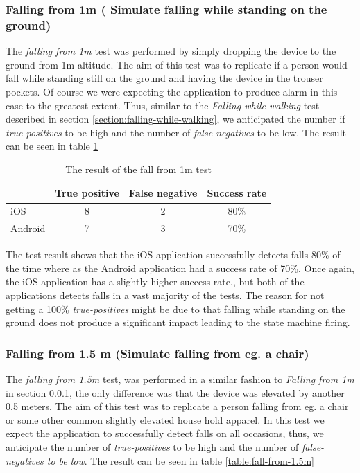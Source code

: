 \documentclass[12pt, a4paper, onecolumn]{article}
\begin{document}
	
	\subsubsection{Falling  from 1m ( Simulate falling while standing on the ground)}
	\label{section:falling-from-1m}
	The  \textit{falling from 1m} test was performed by simply dropping the device to the ground from 1m altitude. The aim of this test was to replicate if a person would fall while standing still on the ground and having the device in the trouser pockets. Of course we were expecting the application to produce alarm in this case to the greatest extent. Thus, similar to the \textit{Falling while walking} test described in section \ref{section:falling-while-walking}, we anticipated the number if \textit{true-positives} to be high and the number of \textit{false-negatives} to be low. The result can be seen in table \ref{table:fall-from-1m}
	
	\begin{table}[H]
		\centering
		\begin{tabular}{|l|c|c|c|}
			\hline
			& True positive & False negative & Success rate \\ \hline
			iOS     & 8            & 2             & 80\%        \\ \hline
			Android & 7            & 3              & 70\%        \\ \hline
		\end{tabular}
		\caption{The result of the fall from 1m test}
		\label{table:fall-from-1m}
	\end{table}
	
	The test result shows that the iOS application successfully detects falls 80\% of the time where as the Android application had a success rate of 70\%. Once again, the iOS application has a slightly higher success rate,, but both of the applications detects falls in a vast majority of the tests. The reason for not getting a 100\% \textit{true-positives} might be due to that falling while standing on the ground does not produce a significant impact leading to the state machine firing.
	
	\subsubsection{Falling from 1.5 m (Simulate falling from eg. a chair)}
	\label{section:falling-from-1.5m}
	The \textit{falling from 1.5m} test, was performed in a similar fashion to \textit{Falling from 1m} in section \ref{section:falling-from-1m}, the only difference was that the device was elevated by another 0.5 meters. The aim of this test was to replicate a person falling from eg. a chair or some other common slightly elevated house hold apparel. In this test we expect the application to successfully detect falls on all occasions, thus, we anticipate the number of \textit{true-positives} to be high and the number of \textit{false-negatives to be low}. The result can be seen in table \ref{table:fall-from-1.5m}
	
\end{document}

